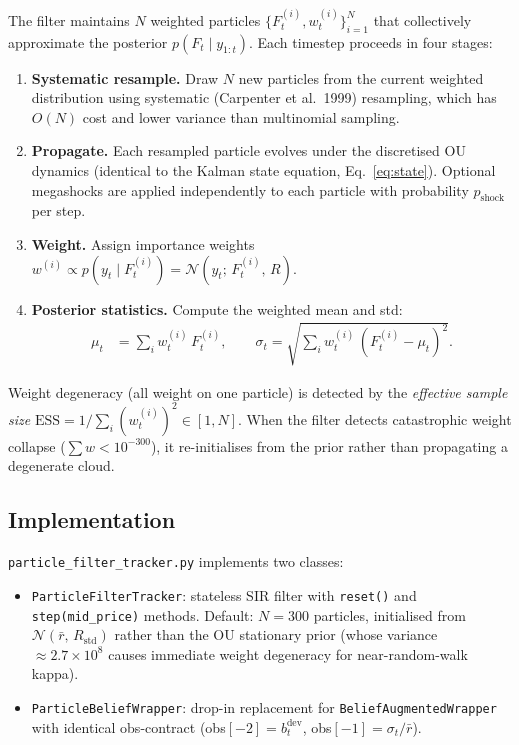 \documentclass[11pt]{article}
\begin{document}
The filter maintains $N$ weighted particles $\{F_t^{(i)}, w_t^{(i)}\}_{i=1}^N$
that collectively approximate the posterior $p(F_t \mid y_{1:t})$.
Each timestep proceeds in four stages:

\begin{enumerate}[leftmargin=1.5em]
  \item \textbf{Systematic resample.} Draw $N$ new particles from the current
    weighted distribution using systematic (Carpenter et al.~1999) resampling,
    which has $O(N)$ cost and lower variance than multinomial sampling.
  \item \textbf{Propagate.} Each resampled particle evolves under the
    discretised OU dynamics (identical to the Kalman state equation,
    Eq.~\ref{eq:state}).
    Optional megashocks are applied independently to each particle with
    probability $p_{\text{shock}}$ per step.
  \item \textbf{Weight.} Assign importance weights
    $w^{(i)} \propto p(y_t \mid F_t^{(i)}) = \mathcal{N}(y_t;\, F_t^{(i)},\, R)$.
  \item \textbf{Posterior statistics.} Compute the weighted mean and std:
    \begin{align*}
    \mu_t    &= \sum_i w_t^{(i)}\,F_t^{(i)}, \qquad
    \sigma_t = \sqrt{\sum_i w_t^{(i)}\,(F_t^{(i)} - \mu_t)^2}.
    \end{align*}
\end{enumerate}

\noindent Weight degeneracy (all weight on one particle) is detected by
the \emph{effective sample size}
$\mathrm{ESS} = 1/\sum_i (w_t^{(i)})^2 \in [1, N]$.
When the filter detects catastrophic weight collapse ($\sum w < 10^{-300}$),
it re-initialises from the prior rather than propagating a degenerate cloud.

\subsection{Implementation}

\texttt{particle\_filter\_tracker.py} implements two classes:
\begin{itemize}[leftmargin=1.5em]
  \item \texttt{ParticleFilterTracker}: stateless SIR filter with
    \texttt{reset()} and \texttt{step(mid\_price)} methods.
    Default: $N = 300$ particles, initialised from
    $\mathcal{N}(\bar{r},\, R_{\text{std}})$ rather than the OU stationary prior
    (whose variance $\approx 2.7 \times 10^8$ causes immediate weight degeneracy
    for near-random-walk kappa).
  \item \texttt{ParticleBeliefWrapper}: drop-in replacement for
    \texttt{BeliefAugmentedWrapper} with identical obs-contract
    (obs$[-2] = b_t^{\text{dev}}$, obs$[-1] = \sigma_t/\bar{r}$).
\end{itemize}
\end{document}
